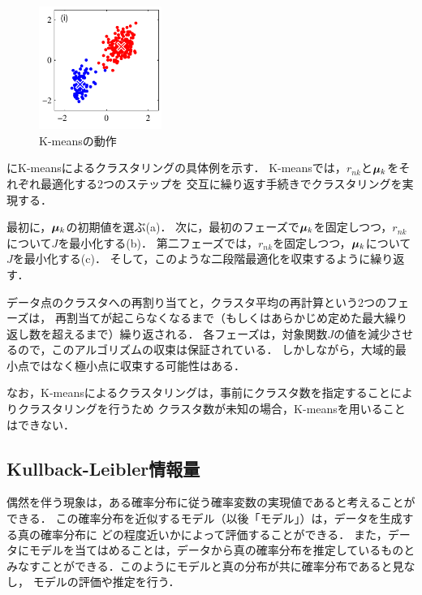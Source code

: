 \begin{figure}[htbp]
\begin{minipage}{0.33\hsize}
\begin{center}
    \end{center}
  \end{minipage}
  \begin{minipage}{0.33\hsize}
    \begin{center}
      \includegraphics[width=40mm]{img/kmeans/Figure91i.pdf}
    \end{center}
  \end{minipage}
  \caption{K-meansの動作}
  \label{fig:k-means}
\end{figure}

にK-meansによるクラスタリングの具体例を示す．
K-meansでは，$r_{nk}$と$\boldsymbol{\mu}_k$をそれぞれ最適化する2つのステップを
交互に繰り返す手続きでクラスタリングを実現する．

最初に，$\boldsymbol{\mu}_k$の初期値を選ぶ(a)．
次に，最初のフェーズで$\boldsymbol{\mu}_k$を固定しつつ，$r_{nk}$について$J$を最小化する(b)．
第二フェーズでは，$r_{nk}$を固定しつつ，$\boldsymbol{\mu}_k$について$J$を最小化する(c)．
そして，このような二段階最適化を収束するように繰り返す．

データ点のクラスタへの再割り当てと，クラスタ平均の再計算という2つのフェーズは，
再割当てが起こらなくなるまで（もしくはあらかじめ定めた最大繰り返し数を超えるまで）繰り返される．
各フェーズは，対象関数$J$の値を減少させるので，このアルゴリズムの収束は保証されている．
しかしながら，大域的最小点ではなく極小点に収束する可能性はある．

なお，K-meansによるクラスタリングは，事前にクラスタ数を指定することによりクラスタリングを行うため
クラスタ数が未知の場合，K-meansを用いることはできない．

\subsection{Kullback-Leibler情報量}
偶然を伴う現象は，ある確率分布に従う確率変数の実現値であると考えることができる．
この確率分布を近似するモデル（以後「モデル」）は，データを生成する真の確率分布に
どの程度近いかによって評価することができる．
また，データにモデルを当てはめることは，データから真の確率分布を推定しているものと
みなすことができる．このようにモデルと真の分布が共に確率分布であると見なし，
モデルの評価や推定を行う．

